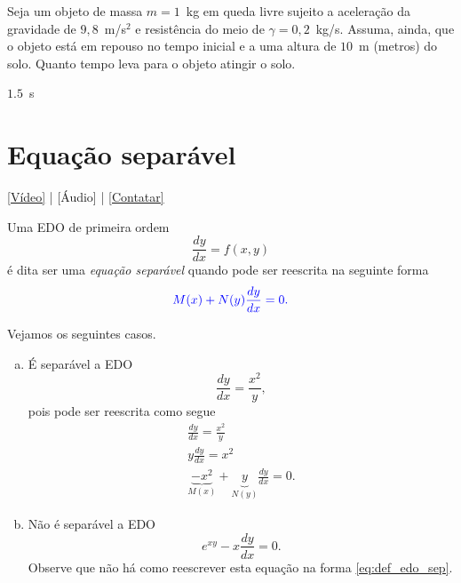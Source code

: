 \begin{exer}
  Seja um objeto de massa $m = 1$~kg em queda livre sujeito a aceleração da gravidade de $9,8$~m/s$^2$ e resistência do meio de $\gamma = 0,2$~kg/s. Assuma, ainda, que o objeto está em repouso no tempo inicial e a uma altura de $10$~m (metros) do solo. Quanto tempo leva para o objeto atingir o solo.
\end{exer}
\begin{resp}
  $1.5$~s
\end{resp}

\section{Equação separável}\label{cap_edo1ordem_sec_eqsep}

\begin{flushright}
  \href{https://archive.org/details/edo-ordem-1-separavel}{[Vídeo]} | [Áudio] | \href{https://phkonzen.github.io/notas/contato.html}{[Contatar]}
\end{flushright}

Uma EDO de primeira ordem
\begin{equation}
  \frac{dy}{dx} = f(x,y)
\end{equation}
é dita ser uma \emph{equação separável} quando pode ser reescrita na seguinte forma
\begin{equation}\label{eq:def_edo_sep}
  {\color{blue} M(x) + N(y)\frac{dy}{dx} = 0.}
\end{equation}

\begin{ex}\label{ex:edo_sep_def}
  Vejamos os seguintes casos.
  \begin{enumerate}[a)]
  \item É separável a EDO
    \begin{equation}
      \frac{dy}{dx} = \frac{x^2}{y},
    \end{equation}
    pois pode ser reescrita como segue
    \begin{gather}
      \frac{dy}{dx} = \frac{x^2}{y} \\
      y\frac{dy}{dx} = x^2 \\
      \underbrace{-x^2}_{M(x)} + \underbrace{y}_{N(y)}\frac{dy}{dx} = 0.
    \end{gather}
  \item Não é separável a EDO
    \begin{equation}
      e^{xy} - x\frac{dy}{dx} = 0.
    \end{equation}
    Observe que não há como reescrever esta equação na forma \eqref{eq:def_edo_sep}.
  \end{enumerate}
\end{ex}

